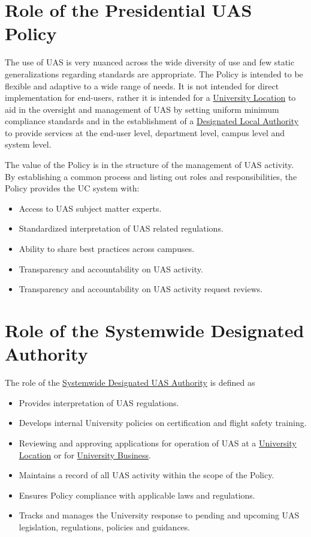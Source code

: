 \documentclass[
]{book}
\providecommand{\tightlist}{%
  \setlength{\itemsep}{0pt}\setlength{\parskip}{0pt}}
\begin{document}
\hypertarget{role-of-the-presidential-uas-policy}{%
\section{Role of the Presidential UAS Policy}\label{role-of-the-presidential-uas-policy}}

The use of UAS is very nuanced across the wide diversity of use and few static generalizations regarding standards are appropriate. The Policy is intended to be flexible and adaptive to a wide range of needs. It is not intended for direct implementation for end-users, rather it is intended for a \protect\hyperlink{UL}{University Location} to aid in the oversight and management of UAS by setting uniform minimum compliance standards and in the establishment of a \protect\hyperlink{DLA}{Designated Local Authority} to provide services at the end-user level, department level, campus level and system level.

The value of the Policy is in the structure of the management of UAS activity. By establishing a common process and listing out roles and responsibilities, the Policy provides the UC system with:

\begin{itemize}
\tightlist
\item
  Access to UAS subject matter experts.
\item
  Standardized interpretation of UAS related regulations.
\item
  Ability to share best practices across campuses.
\item
  Transparency and accountability on UAS activity.
\item
  Transparency and accountability on UAS activity request reviews.
\end{itemize}

\hypertarget{role-of-the-systemwide-designated-authority}{%
\section{Role of the Systemwide Designated Authority}\label{role-of-the-systemwide-designated-authority}}

The role of the \protect\hyperlink{SDA}{Systemwide Designated UAS Authority} is defined as

\begin{itemize}
\tightlist
\item
  Provides interpretation of UAS regulations.
\item
  Develops internal University policies on certification and flight safety training.
\item
  Reviewing and approving applications for operation of UAS at a \protect\hyperlink{UL}{University Location} or for \protect\hyperlink{UB}{University Business}.
\item
  Maintains a record of all UAS activity within the scope of the Policy.
\item
  Ensures Policy compliance with applicable laws and regulations.
\item
  Tracks and manages the University response to pending and upcoming UAS legislation, regulations, policies and guidances.
\end{itemize}
\end{document}
